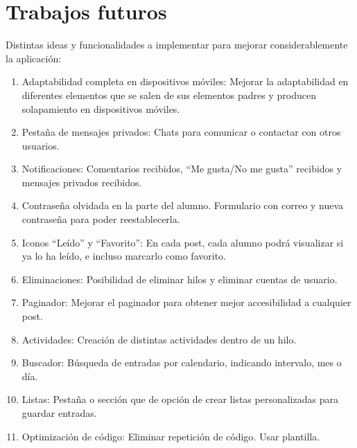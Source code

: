 \documentclass[a4paper, 12pt]{book}
\begin{document}
\section{Trabajos futuros}
\label{sec:trabajos_futuros}
Distintas ideas y funcionalidades a implementar para mejorar considerablemente la aplicaci\'on:
\begin{enumerate}
  \item Adaptabilidad completa en dispositivos m\'oviles: Mejorar la adaptabilidad en diferentes elementos que se salen de sus elementos padres y producen solapamiento en
  dispositivos m\'oviles.
  \item	Pesta\~na de mensajes privados: Chats para comunicar o contactar con otros usuarios.
  \item Notificaciones: Comentarios recibidos, ``Me gusta/No me gusta'' recibidos y mensajes privados recibidos.
  \item Contrase\~na olvidada en la parte del alumno. Formulario con correo y nueva contrase\~na para poder reestablecerla.
  \item Iconos ``Le\'ido'' y ``Favorito'': En cada post, cada alumno podr\'a visualizar si ya lo ha le\'ido, e incluso marcarlo como favorito.
  \item Eliminaciones: Posibilidad de eliminar hilos y eliminar cuentas de usuario.
  \item Paginador: Mejorar el paginador para obtener mejor accesibilidad a cualquier post.
  \item Actividades: Creaci\'on de distintas actividades dentro de un hilo.
  \item Buscador: B\'usqueda de entradas por calendario, indicando intervalo, mes o d\'ia.
  \item Listas: Pesta\~na o secci\'on que de opci\'on de crear listas personalizadas para guardar entradas.
  \item Optimizaci\'on de c\'odigo: Eliminar repetici\'on de c\'odigo. Usar plantilla.
\end{enumerate}




\cleardoublepage
\appendix
\end{document}
